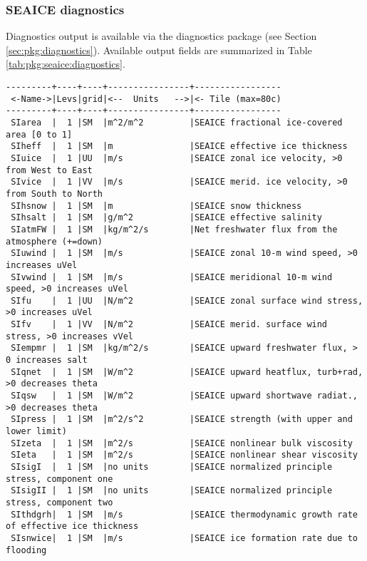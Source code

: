 
\subsubsection{SEAICE diagnostics
\label{sec:pkg:seaice:diagnostics}}

Diagnostics output is available via the diagnostics package
(see Section \ref{sec:pkg:diagnostics}).
Available output fields are summarized in 
Table \ref{tab:pkg:seaice:diagnostics}.

\begin{table}[!ht]
\centering
\label{tab:pkg:seaice:diagnostics}
{\footnotesize
\begin{verbatim}
---------+----+----+----------------+-----------------
 <-Name->|Levs|grid|<--  Units   -->|<- Tile (max=80c)
---------+----+----+----------------+-----------------
 SIarea  |  1 |SM  |m^2/m^2         |SEAICE fractional ice-covered area [0 to 1]
 SIheff  |  1 |SM  |m               |SEAICE effective ice thickness
 SIuice  |  1 |UU  |m/s             |SEAICE zonal ice velocity, >0 from West to East
 SIvice  |  1 |VV  |m/s             |SEAICE merid. ice velocity, >0 from South to North
 SIhsnow |  1 |SM  |m               |SEAICE snow thickness
 SIhsalt |  1 |SM  |g/m^2           |SEAICE effective salinity
 SIatmFW |  1 |SM  |kg/m^2/s        |Net freshwater flux from the atmosphere (+=down)
 SIuwind |  1 |SM  |m/s             |SEAICE zonal 10-m wind speed, >0 increases uVel
 SIvwind |  1 |SM  |m/s             |SEAICE meridional 10-m wind speed, >0 increases uVel
 SIfu    |  1 |UU  |N/m^2           |SEAICE zonal surface wind stress, >0 increases uVel
 SIfv    |  1 |VV  |N/m^2           |SEAICE merid. surface wind stress, >0 increases vVel
 SIempmr |  1 |SM  |kg/m^2/s        |SEAICE upward freshwater flux, > 0 increases salt
 SIqnet  |  1 |SM  |W/m^2           |SEAICE upward heatflux, turb+rad, >0 decreases theta
 SIqsw   |  1 |SM  |W/m^2           |SEAICE upward shortwave radiat., >0 decreases theta
 SIpress |  1 |SM  |m^2/s^2         |SEAICE strength (with upper and lower limit)
 SIzeta  |  1 |SM  |m^2/s           |SEAICE nonlinear bulk viscosity
 SIeta   |  1 |SM  |m^2/s           |SEAICE nonlinear shear viscosity
 SIsigI  |  1 |SM  |no units        |SEAICE normalized principle stress, component one
 SIsigII |  1 |SM  |no units        |SEAICE normalized principle stress, component two
 SIthdgrh|  1 |SM  |m/s             |SEAICE thermodynamic growth rate of effective ice thickness
 SIsnwice|  1 |SM  |m/s             |SEAICE ice formation rate due to flooding

\end{verbatim}}
\end{table}

